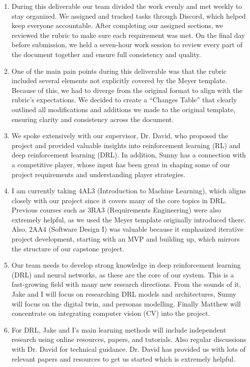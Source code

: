 \documentclass{article}
\begin{document}
\begin{enumerate}
    \item During this deliverable our team divided the work evenly and met weekly to stay 
    organized. We assigned and tracked tasks through Discord, which 
    helped keep everyone accountable. After completing our assigned
     sections, we reviewed the rubric to make sure each requirement
      was met. On the final day before submission, we held a seven-hour
      work session to review every part of the document together and
       ensure full consistency and quality.

    \item One of the main pain points during this deliverable was that the rubric included
    several elements not explicitly covered by the Meyer template.
     Because of this, we had to diverge from the original format to 
     align with the rubric’s expectations. We decided to create
      a “Changes Table” that clearly outlined all modifications and
       additions we made to the original template, ensuring clarity
        and consistency across the document.

    \item We spoke extensively with our supervisor, Dr. David,
     who proposed the project and provided valuable insights into 
     reinforcement learning (RL) and deep reinforcement learning (DRL).
      In addition, Sunny has a connection with a competitive 
      \emph{\Catan{}} player, whose input has been great in
     shaping some of our project requirements and understanding 
       player strategies.

    \item I am currently taking 4AL3 (Introduction to Machine Learning),
     which aligns closely with our project since it covers many of the
      core topics in DRL. Previous courses such as 3RA3 (Requirements Engineering)
       were also extremely helpful, as we used the Meyer template
        originally introduced there. Also, 2AA4 (Software Design I)
         was valuable because it emphasized iterative project development, starting
          with an MVP and building up, which mirrors the structure of our capstone project.

    \item Our team needs to develop strong knowledge in deep reinforcement learning (DRL)
     and neural networks, as these are the core of our system. This is a fast-growing field
      with many new research directions. From the sounds of it, Jake and I will focus on researching DRL models 
      and architectures, Sunny will focus on the digital twin,
      and personas modelling. Finally Matthew will concentrate on integrating computer vision (CV) into the project.

    \item For DRL, Jake and I's main learning methods will include independent
     research using online resources, papers, and tutorials. Also regular discussions
      with Dr. David for technical guidance. Dr. David has provided us with lots of relevant papers
      and resources to get us started which is extremely helpful. 
\end{enumerate}
\end{document}

